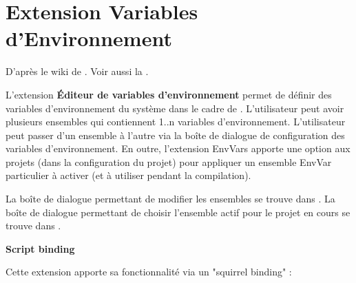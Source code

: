 \section{Extension Variables d'Environnement}\label{sec:EnvVar_Plugin}

D'après le wiki de \codeblocks. Voir aussi la .

L'extension \textbf{Éditeur de variables d'environnement} permet de définir des variables d'environnement du système dans le cadre de \codeblocks.\newline
L'utilisateur peut avoir plusieurs ensembles qui contiennent 1..n variables d'environnement.\newline
L'utilisateur peut passer d'un ensemble à l'autre via la boîte de dialogue de configuration des variables d'environnement.\newline
En outre, l'extension EnvVars apporte une option aux projets (dans la configuration du projet) pour appliquer un ensemble EnvVar particulier à activer (et à utiliser pendant la compilation).

La boîte de dialogue permettant de modifier les ensembles se trouve dans .\newline
La boîte de dialogue permettant de choisir l'ensemble actif pour le projet en cours se trouve dans .\newline

\textbf{Script binding}

Cette extension apporte sa fonctionnalité via un "squirrel binding" : 

